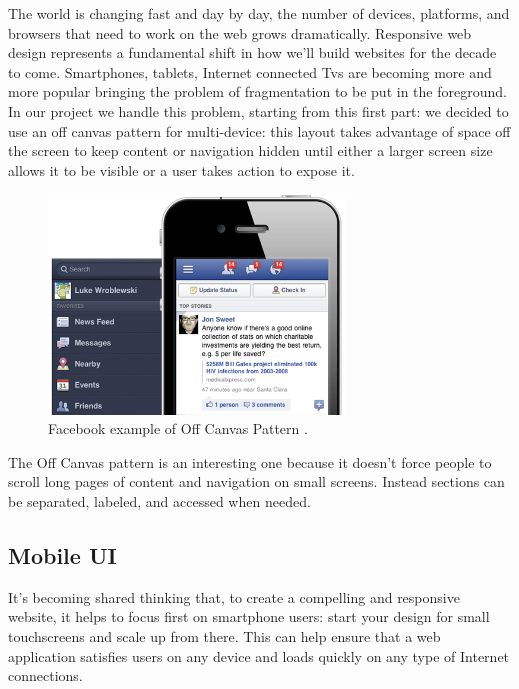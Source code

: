 \documentclass[a4paper,13pt]{report}
\begin{document}
The world is changing fast and day by day, the number of devices, platforms, and browsers that need to work on the web grows dramatically. Responsive web design represents a fundamental shift in how we'll build websites for the decade to come.
Smartphones, tablets, Internet connected Tvs are becoming more and more popular bringing the problem of fragmentation to be put in the foreground.
In our project we handle this problem, starting from this first part: we decided to use an off canvas pattern for multi-device: this layout takes advantage of space off the screen to keep content or navigation hidden until either a larger screen size allows it to be visible or a user takes action to expose it.
\\[0.2cm]
\begin{figure}[H]
  \caption{Facebook example of Off Canvas Pattern .}
  \centering
    \includegraphics[width=0.7\textwidth]{pics/UISketches/offCanvas}
\end{figure}

The Off Canvas pattern is an interesting one because it doesn't force people to scroll long pages of content and navigation on small screens. Instead sections can be separated, labeled, and accessed when needed.


\subsection {Mobile UI}
It's becoming shared thinking that, to create a compelling and responsive website, it helps to focus first on smartphone users: start your design for small touchscreens and scale up from there. This can help ensure that a web application satisfies users on any device and loads quickly on any type of Internet connections.

\end{document}
